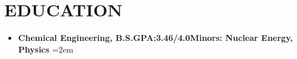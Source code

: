 \documentclass[AutoFakeBold]{resume}
\begin{document}
\section{\makebox[.75em][c]{\faGraduationCap} \textbf{EDUCATION}}
\begin{itemize}
    \item \textbf{Chemical Engineering, B.S.}\qquad \textbf{GPA:3.46/4.0}\qquad \textbf{Minors: Nuclear Energy, Physics}
    \hangindent=2em 
\end{itemize}
\end{document}
